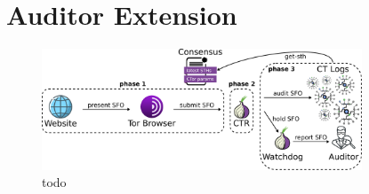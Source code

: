 \section{Auditor Extension} \label{sec:auditor}

%
%

%
%

%

%
%
%
%

%
%

%
%


\begin{figure}
    \centering
    \includegraphics[width=0.85\textwidth]{img/design-auditor}
    \caption{todo}
    \label{fig:design-auditor}
\end{figure}
